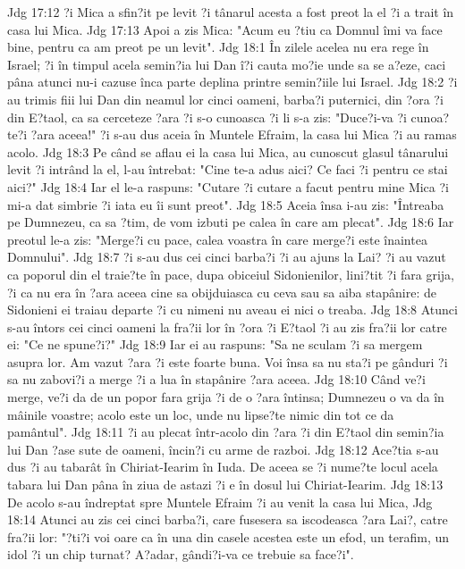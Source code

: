 Jdg 17:12  ?i Mica a sfin?it pe levit ?i tânarul acesta a fost preot la el ?i a trait în casa lui Mica.
Jdg 17:13  Apoi a zis Mica: "Acum eu ?tiu ca Domnul îmi va face bine, pentru ca am preot pe un levit".
Jdg 18:1  În zilele acelea nu era rege în Israel; ?i în timpul acela semin?ia lui Dan î?i cauta mo?ie unde sa se a?eze, caci pâna atunci nu-i cazuse înca parte deplina printre semin?iile lui Israel.
Jdg 18:2  ?i au trimis fiii lui Dan din neamul lor cinci oameni, barba?i puternici, din ?ora ?i din E?taol, ca sa cerceteze ?ara ?i s-o cunoasca ?i li s-a zis: "Duce?i-va ?i cunoa?te?i ?ara aceea!" ?i s-au dus aceia în Muntele Efraim, la casa lui Mica ?i au ramas acolo.
Jdg 18:3  Pe când se aflau ei la casa lui Mica, au cunoscut glasul tânarului levit ?i intrând la el, l-au întrebat: "Cine te-a adus aici? Ce faci ?i pentru ce stai aici?"
Jdg 18:4  Iar el le-a raspuns: "Cutare ?i cutare a facut pentru mine Mica ?i mi-a dat simbrie ?i iata eu îi sunt preot".
Jdg 18:5  Aceia însa i-au zis: "Întreaba pe Dumnezeu, ca sa ?tim, de vom izbuti pe calea în care am plecat".
Jdg 18:6  Iar preotul le-a zis: "Merge?i cu pace, calea voastra în care merge?i este înaintea Domnului".
Jdg 18:7  ?i s-au dus cei cinci barba?i ?i au ajuns la Lai? ?i au vazut ca poporul din el traie?te în pace, dupa obiceiul Sidonienilor, lini?tit ?i fara grija, ?i ca nu era în ?ara aceea cine sa obijduiasca cu ceva sau sa aiba stapânire: de Sidonieni ei traiau departe ?i cu nimeni nu aveau ei nici o treaba.
Jdg 18:8  Atunci s-au întors cei cinci oameni la fra?ii lor în ?ora ?i E?taol ?i au zis fra?ii lor catre ei: "Ce ne spune?i?"
Jdg 18:9  Iar ei au raspuns: "Sa ne sculam ?i sa mergem asupra lor. Am vazut ?ara ?i este foarte buna. Voi însa sa nu sta?i pe gânduri ?i sa nu zabovi?i a merge ?i a lua în stapânire ?ara aceea.
Jdg 18:10  Când ve?i merge, ve?i da de un popor fara grija ?i de o ?ara întinsa; Dumnezeu o va da în mâinile voastre; acolo este un loc, unde nu lipse?te nimic din tot ce da pamântul".
Jdg 18:11  ?i au plecat într-acolo din ?ara ?i din E?taol din semin?ia lui Dan ?ase sute de oameni, încin?i cu arme de razboi.
Jdg 18:12  Ace?tia s-au dus ?i au tabarât în Chiriat-Iearim în Iuda. De aceea se ?i nume?te locul acela tabara lui Dan pâna în ziua de astazi ?i e în dosul lui Chiriat-Iearim.
Jdg 18:13  De acolo s-au îndreptat spre Muntele Efraim ?i au venit la casa lui Mica,
Jdg 18:14  Atunci au zis cei cinci barba?i, care fusesera sa iscodeasca ?ara Lai?, catre fra?ii lor: "?ti?i voi oare ca în una din casele acestea este un efod, un terafim, un idol ?i un chip turnat? A?adar, gândi?i-va ce trebuie sa face?i".

